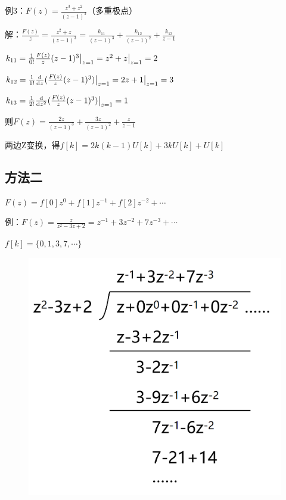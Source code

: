 \documentclass[UTF8]{ctexart}
\begin{document}
\begin{enumerate}[label=(\arabic*),itemindent=0pt,labelindent=\parindent,labelwidth=2em,labelsep=5pt,leftmargin=*]
        例3：$F(z)=\frac{z^3+z^2}{(z-1)^3}$（多重极点）\par
        \qquad 解：$\frac{F(z)}{z}=\frac{z^2+z}{(z-1)^3}=\frac{k_{11}}{(z-1)^3}+\frac{k_{12}}{(z-1)^2}+\frac{k_{13}}{z-1}$ \par
        \qquad \qquad $k_{11}=\frac{1}{0!}\frac{F(z)}{z}(z-1)^3\big{|}_{z=1}=z^2+z\big{|}_{z=1}=2$ \par
        \qquad \qquad $k_{12}=\frac{1}{1!}\frac{{\rm d}}{{\rm d}z}(\frac{F(z)}{z}(z-1)^3)\big{|}_{z=1}=2z+1\big{|}_{z=1}=3$ \par
        \qquad \qquad $k_{13}=\frac{1}{2!}\frac{{\rm d}}{{\rm d}z^2}(\frac{F(z)}{z}(z-1)^3)\big{|}_{z=1}=1$ \par
        \qquad \qquad 则$F(z)=\frac{2z}{(z-1)^3}+\frac{3z}{(z-1)^2}+\frac{z}{z-1}$ \par
        \qquad \qquad 两边Z变换，得$f[k]=2k(k-1)U[k]+3kU[k]+U[k]$
\end{enumerate}\par
\subsection{方法二}
$F(z)=f[0]z^0+f[1]z^{-1}+f[2]z^{-2}+\cdots$ \par
例：$F(z)=\frac{z}{z^2-3z+2}=z^{-1}+3z^{-2}+7z^{-3}+\cdots$ \par
\qquad $f[k]=\{0,1,3,7,\cdots\}$
\begin{figure}[h]
  \qquad \qquad \includegraphics[scale=0.2]{逆Z变换方法二.png}
\end{figure}
\end{document}
